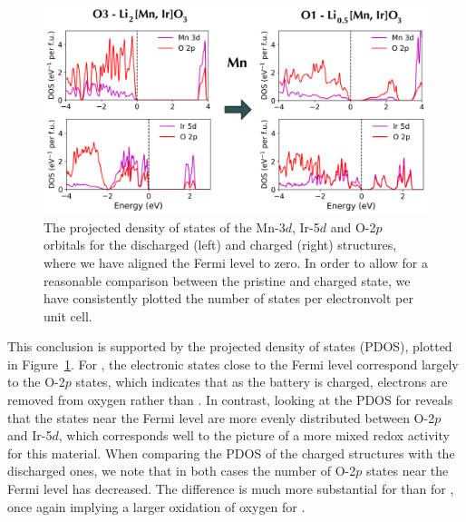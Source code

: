 \begin{refsection}
\begin{figure}[ht] 
\centering 
\captionsetup{width=0.9\linewidth}
\includegraphics[width=\textwidth]{Figures/batteries/charge_pdos_Mn_Ir.png} 
\caption{The projected density of states of the Mn-3$d$, Ir-5$d$ and O-2$p$ 
orbitals for the discharged (left) and charged (right) structures, where we 
have aligned the Fermi level to zero. In order to allow for a reasonable 
comparison between the pristine and charged state, we have consistently 
plotted the number of states per electronvolt per unit cell.} 
\label{batteries:fig-charge_pdos_Mn_Ir} 
\end{figure} 
 
This conclusion is supported by the projected density of states (PDOS), 
plotted in Figure~\ref{batteries:fig-charge_pdos_Mn_Ir}. For , the 
electronic states close to the Fermi level correspond largely to the O-2$p$ 
states, which indicates that as the battery is charged, electrons are removed 
from oxygen rather than . In contrast, looking at the PDOS for 
 reveals that the states near the Fermi level are more evenly 
distributed between O-2$p$ and Ir-5$d$, which corresponds well to the picture 
of a more mixed redox activity for this material. When comparing the PDOS of 
the charged structures with the discharged ones, we note that in both cases 
the number of O-2$p$ states near the Fermi level has decreased. The difference 
is much more substantial for  than for , once again 
implying a larger oxidation of oxygen for . 
 
 \label{batteries:sec-dimer} 
 

\end{refsection}
